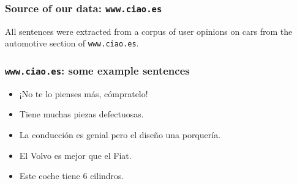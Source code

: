 \documentclass[10pt]{beamer}
\newenvironment{itemwide}%
{\begin{itemize}%
    \setlength{\itemsep}{5pt}%
    \setlength{\parskip}{5pt}}%
  {\end{itemize}}
\begin{document}
\begin{frame}
  \frametitle{Source of our data: \texttt{www.ciao.es}}

All sentences were extracted from a corpus of user opinions on cars from the automotive section of \texttt{www.ciao.es}.

  \begin{center}
  \end{center}

\end{frame}

\begin{frame}
  \frametitle{\texttt{www.ciao.es}: some example sentences}
\begin{itemwide}
 \item ¡No te lo pienses m\'{a}s, c\'ompratelo!
 \item Tiene muchas piezas defectuosas.
 \item La conducci\'{o}n es genial pero el diseño una porquer\'{i}a.
 \item El Volvo es mejor que el Fiat.
 \item Este coche tiene 6 cilindros.
\end{itemwide}


\end{frame}
\end{document}
